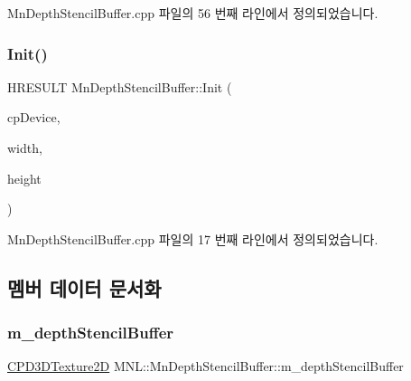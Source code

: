 Mn\+Depth\+Stencil\+Buffer.\+cpp 파일의 56 번째 라인에서 정의되었습니다.

\mbox{\label{class_m_n_l_1_1_mn_depth_stencil_buffer_a5cbabb78041c31d65ff6204aa733fa44}} 
\subsubsection{\texorpdfstring{Init()}{Init()}}
{\footnotesize\ttfamily H\+R\+E\+S\+U\+LT Mn\+Depth\+Stencil\+Buffer\+::\+Init (\begin{DoxyParamCaption}\item[{const \hyperlink{namespace_m_n_l_a1eec210db8f309a4a9ac0d9658784c31}{C\+P\+D3\+D\+Device}}]{cp\+Device,  }\item[{U\+I\+NT}]{width,  }\item[{U\+I\+NT}]{height }\end{DoxyParamCaption})}



Mn\+Depth\+Stencil\+Buffer.\+cpp 파일의 17 번째 라인에서 정의되었습니다.



\subsection{멤버 데이터 문서화}
\mbox{\label{class_m_n_l_1_1_mn_depth_stencil_buffer_ae995fe33e73c061329841ca2e1fd1c0d}} 
\subsubsection{\texorpdfstring{m\+\_\+depth\+Stencil\+Buffer}{m\_depthStencilBuffer}}
{\footnotesize\ttfamily \hyperlink{namespace_m_n_l_addb538e1cbd1f443e6db5e6312487c51}{C\+P\+D3\+D\+Texture2D} M\+N\+L\+::\+Mn\+Depth\+Stencil\+Buffer\+::m\+\_\+depth\+Stencil\+Buffer\hspace{0.3cm}{\ttfamily [private]}}



